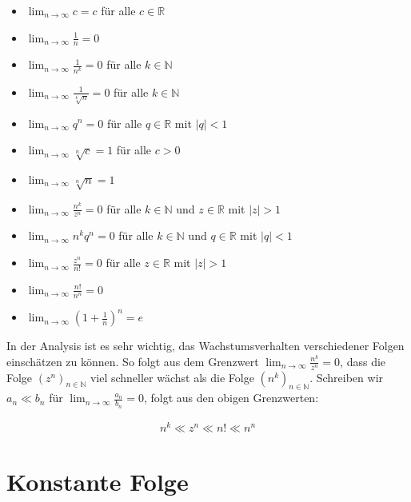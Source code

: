 \documentclass[fontsize=9pt,
               parskip=half-,
               DIV=14,
               listof=chapterentry,
               tocflat]{scrbook}
\begin{document}
\begin{itemize}
\item $\lim _{n\rightarrow \infty }c=c$ für alle $c\in \mathbb {R} $
\item $\lim _{n\rightarrow \infty }{\tfrac {1}{n}}=0$
\item $\lim _{n\rightarrow \infty }{\tfrac {1}{n^{k}}}=0$ für alle $k\in \mathbb {N} $
\item $\lim _{n\rightarrow \infty }{\tfrac {1}{\sqrt[{k}]{n}}}=0$ für alle $k\in \mathbb {N} $
\item $\lim _{n\rightarrow \infty }q^{n}=0$ für alle $q\in \mathbb {R} $ mit $|q|<1$
\item $\lim _{n\rightarrow \infty }{\sqrt[{n}]{c}}=1$ für alle $c>0$
\item $\lim _{n\rightarrow \infty }{\sqrt[{n}]{n}}=1$
\item $\lim _{n\rightarrow \infty }{\tfrac {n^{k}}{z^{n}}}=0$ für alle $k\in \mathbb {N} $ und $z\in \mathbb {R} $ mit $|z|>1$
\item $\lim _{n\rightarrow \infty }n^{k}q^{n}=0$ für alle $k\in \mathbb {N} $ und $q\in \mathbb {R} $ mit $|q|<1$
\item $\lim _{n\rightarrow \infty }{\tfrac {z^{n}}{n!}}=0$ für alle $z\in \mathbb {R} $ mit $|z|>1$
\item $\lim _{n\rightarrow \infty }{\tfrac {n!}{n^{n}}}=0$
\item $\lim _{n\rightarrow \infty }\left(1+{\tfrac {1}{n}}\right)^{n}=e$
\end{itemize}



\begin{hint*}
In der Analysis ist es sehr wichtig, das Wachstumsverhalten verschiedener Folgen einschätzen zu können. So folgt aus dem Grenzwert $\lim _{n\rightarrow \infty }{\tfrac {n^{k}}{z^{n}}}=0$, dass die Folge $(z^{n})_{n\in \mathbb {N} }$ viel schneller wächst als die Folge $(n^{k})_{n\in \mathbb {N} }$. Schreiben wir $a_{n}\ll b_{n}$ für $\lim _{n\to \infty }{\tfrac {a_{n}}{b_{n}}}=0$, folgt aus den obigen Grenzwerten:

\begin{align*}
n^{k}\ll z^{n}\ll n!\ll n^{n}
\end{align*}

\end{hint*}

\section{Konstante Folge}
\end{document}
